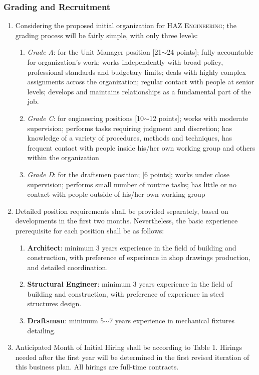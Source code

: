 \documentclass[a4paper,oneside,12pt,final]{article}
\begin{document}
\subsubsection{Grading and Recruitment}
\label{sec:grading}
\begin{enumerate}[label=\alph*.]
	\item Considering the proposed initial organization for \textsc{HAZ Engineering}; the grading process will be fairly simple, with only three levels:
	\begin{enumerate}[label=(1) ]
		\item \emph{Grade A}: for the Unit Manager position [21$\sim$24 points]; fully accountable for organization's work; works independently with broad policy, professional standards and budgetary limits; deals with highly complex assignments across the organization; regular contact with people at senior levels; develops and maintains relationships as a fundamental part of the job.
		\item \emph{Grade C}: for engineering positions [10$\sim$12 points]; works with moderate supervision; performs tasks requiring judgment and discretion; has knowledge of a variety of procedures, methods and techniques, has frequent contact with people inside his/her own working group and others within the organization 
		\item \emph{Grade D}: for the draftsmen position; [6 points]; works under close supervision; performs small number of routine tasks; has little or no contact with people outside of his/her own working group
	\end{enumerate}
	\item Detailed position requirements shall be provided separately, based on developments in the first two months. Nevertheless, the basic experience prerequisite for each position shall be as follows:
	\begin{enumerate}[label=(1)]
	\item \textbf{Architect}: minimum 3 years experience in the field of building and construction, with preference of experience in shop drawings production, and detailed coordination.
	\item \textbf{Structural Engineer}: minimum 3 years experience in the field of building and construction, with preference of experience in steel structures design.
	\item \textbf{Draftsman}: minimum 5$\sim$7 years experience in mechanical fixtures detailing.
	\end{enumerate}
	\item Anticipated Month of Initial Hiring shall be according to Table 1. Hirings needed after the first year will be determined in the first revised iteration of this business plan. All hirings are full-time contracts.
\end{enumerate}
	
\end{document}
